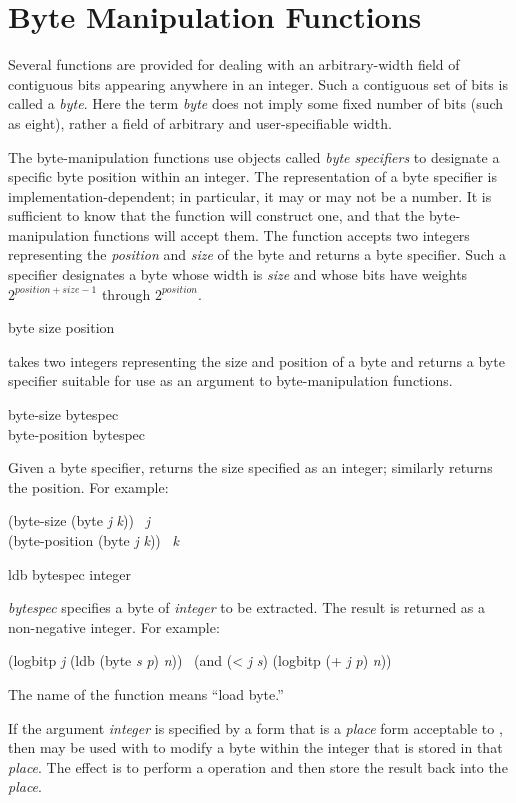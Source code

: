 \section{Byte Manipulation Functions}

Several functions are provided for dealing with an arbitrary-width field of
contiguous bits appearing anywhere in an integer.
Such a contiguous set of bits is called a \emph{byte}.
Here the term \emph{byte} does not imply some fixed number of bits
(such as eight), rather a field of arbitrary and user-specifiable width.

The byte-manipulation functions use objects called \emph{byte specifiers} to
designate a specific byte position within an integer.
The representation of a byte specifier is implementation-dependent;
in particular, it may or may not be a number.
It is sufficient to know that the function  will construct one,
and that the byte-manipulation functions will accept them.
The function  accepts two integers representing
the \emph{position} and \emph{size} of the byte and returns
a byte specifier.
Such a specifier designates a byte whose width is \emph{size}
and whose bits have weights $ 2^{position+size-1} $
through $ 2^{position} $.

\begin{defun}[Function]
byte size position

 takes two integers representing the size and position
of a byte and returns a byte specifier suitable for use
as an argument to byte-manipulation functions.
\end{defun}

\begin{defun}[Function]
byte-size bytespec \\
byte-position bytespec

Given a byte specifier,  returns the size specified as an
integer;  similarly returns the position.
For example:
\begin{lisp}
(byte-size (byte \emph{j} \emph{k})) \EQ\ \emph{j} \\
(byte-position (byte \emph{j} \emph{k})) \EQ\ \emph{k}
\end{lisp}
\end{defun}

\begin{defun}[Function]
ldb bytespec integer

\emph{bytespec} specifies a byte of \emph{integer} to be extracted.
The result is returned as a non-negative integer.
For example:
\begin{lisp}
(logbitp \emph{j} (ldb (byte \emph{s} \emph{p}) \emph{n})) \EQ\ (and (< \emph{j} \emph{s}) (logbitp (+ \emph{j} \emph{p}) \emph{n}))
\end{lisp}
The name of the function  means ``load byte.''

If the argument \emph{integer} is specified by a form that is a \emph{place} form
acceptable to , then
 may be used with  to modify
a byte within the integer that is stored
in that \emph{place}.
The effect is to perform a  operation
and then store the result back into the \emph{place}.
\end{defun}

